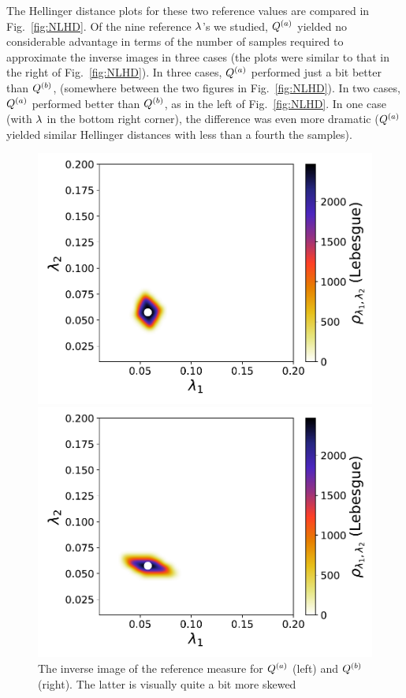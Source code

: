 The Hellinger distance plots for these two reference values are compared in Fig.~\ref{fig:NLHD}. 
Of the nine reference $\lambda$'s we studied, $Q^{(a)}$ yielded no considerable advantage in terms of the number of samples required to approximate the inverse images in three cases (the plots were similar to that in the right of Fig.~\ref{fig:NLHD}). 
In three cases, $Q^{(a)}$ performed just a bit better than $Q^{(b)}$, (somewhere between the two figures in Fig.~\ref{fig:NLHD}). 
In two cases, $Q^{(a)}$ performed better than  $Q^{(b)}$, as in the left of Fig.~\ref{fig:NLHD}. 
In one case (with $\lambda$ in the bottom right corner), the difference was even more dramatic ($Q^{(a)}$ yielded similar Hellinger distances with less than a fourth the samples). 

\begin{figure}[h]
\begin{minipage}{.475\textwidth}
\includegraphics[width=\linewidth]{./images/refheat_pt0Q1_M1N40000_2D_0_1}
\end{minipage}
\begin{minipage}{.475\textwidth}
\includegraphics[width=\linewidth]{./images/refheat_pt0Q2_M1N40000_2D_0_1}
\end{minipage}
\caption{The inverse image of the reference measure for $Q^{(a)}$ (left) and $Q^{(b)}$ (right). The latter is visually quite a bit more skewed }
\label{fig:NLbotleft}
\end{figure}


